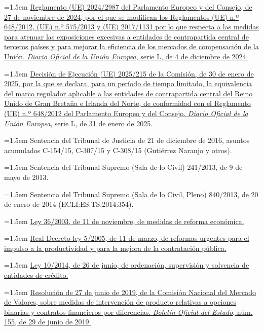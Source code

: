 \documentclass[10pt,a4paper]{article}
\begin{document}
\noindent\hangindent=1.5em \href{https://eur-lex.europa.eu/eli/reg/2024/2987/oj}{Reglamento (UE) 2024/2987 del Parlamento Europeo y del Consejo, de 27 de noviembre de 2024, por el que se modifican los Reglamentos (UE) n.º 648/2012, (UE) n.º 575/2013 y (UE) 2017/1131 por lo que respecta a las medidas para atenuar las exposiciones excesivas a entidades de contrapartida central de terceros países y para mejorar la eficiencia de los mercados de compensación de la Unión. \textit{Diario Oficial de la Unión Europea}, serie L, de 4 de diciembre de 2024.}

\noindent\hangindent=1.5em \href{https://eur-lex.europa.eu/eli/dec_impl/2025/215/oj}{Decisión de Ejecución (UE) 2025/215 de la Comisión, de 30 de enero de 2025, por la que se declara, para un período de tiempo limitado, la equivalencia del marco regulador aplicable a las entidades de contrapartida central del Reino Unido de Gran Bretaña e Irlanda del Norte, de conformidad con el Reglamento (UE) n.º 648/2012 del Parlamento Europeo y del Consejo. \textit{Diario Oficial de la Unión Europea}, serie L, de 31 de enero de 2025.}

\noindent\hangindent=1.5em Sentencia del Tribunal de Justicia de 21 de diciembre de 2016, asuntos acumulados C-154/15, C-307/15 y C-308/15 (Gutiérrez Naranjo y otros).

\noindent\hangindent=1.5em Sentencia del Tribunal Supremo (Sala de lo Civil) 241/2013, de 9 de mayo de 2013.

\noindent\hangindent=1.5em Sentencia del Tribunal Supremo (Sala de lo Civil, Pleno) 840/2013, de 20 de enero de 2014 (ECLI:ES:TS:2014:354).

\noindent\hangindent=1.5em \href{https://www.boe.es/eli/es/l/2003/11/11/36}{Ley 36/2003, de 11 de noviembre, de medidas de reforma económica.}

\noindent\hangindent=1.5em \href{https://www.boe.es/eli/es/rdl/2005/03/11/5}{Real Decreto-ley 5/2005, de 11 de marzo, de reformas urgentes para el impulso a la productividad y para la mejora de la contratación pública.}

\noindent\hangindent=1.5em \href{https://www.boe.es/eli/es/l/2014/06/26/10}{Ley 10/2014, de 26 de junio, de ordenación, supervisión y solvencia de entidades de crédito.}

\noindent\hangindent=1.5em \href{https://www.boe.es/eli/es/res/2019/06/27/(1)}{Resolución de 27 de junio de 2019, de la Comisión Nacional del Mercado de Valores, sobre medidas de intervención de producto relativas a opciones binarias y contratos financieros por diferencias. \textit{Boletín Oficial del Estado}, núm. 155, de 29 de junio de 2019.}
\end{document}
